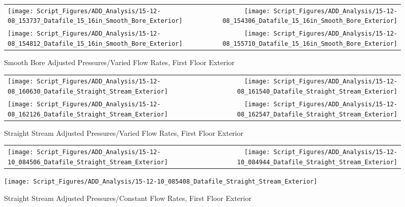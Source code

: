 \documentclass{article}
\begin{document}
\clearpage

\begin{figure}[ht]
\begin{tabular*}{\textwidth}{lr}
\texttt{[image: Script\_Figures/ADD\_Analysis/15-12-08\_153737\_Datafile\_15\_16in\_Smooth\_Bore\_Exterior]} &
\texttt{[image: Script\_Figures/ADD\_Analysis/15-12-08\_154306\_Datafile\_15\_16in\_Smooth\_Bore\_Exterior]} \\
\texttt{[image: Script\_Figures/ADD\_Analysis/15-12-08\_154812\_Datafile\_15\_16in\_Smooth\_Bore\_Exterior]} &
\texttt{[image: Script\_Figures/ADD\_Analysis/15-12-08\_155710\_Datafile\_15\_16in\_Smooth\_Bore\_Exterior]} \\
\end{tabular*}
\caption{Smooth Bore Adjusted Pressures/Varied Flow Rates, First Floor Exterior}
\label{fig:Smooth Bore Adjusted Pressures/Varied Flow Rates, First Floor Exterior}
\end{figure}

\clearpage

\begin{figure}[ht]
\begin{tabular*}{\textwidth}{lr}
\texttt{[image: Script\_Figures/ADD\_Analysis/15-12-08\_160630\_Datafile\_Straight\_Stream\_Exterior]} &
\texttt{[image: Script\_Figures/ADD\_Analysis/15-12-08\_161540\_Datafile\_Straight\_Stream\_Exterior]} \\
\texttt{[image: Script\_Figures/ADD\_Analysis/15-12-08\_162126\_Datafile\_Straight\_Stream\_Exterior]} &
\texttt{[image: Script\_Figures/ADD\_Analysis/15-12-08\_162547\_Datafile\_Straight\_Stream\_Exterior]} \\
\end{tabular*}
\caption{Straight Stream Adjusted Pressures/Varied Flow Rates, First Floor Exterior}
\label{fig:Straight Stream Adjusted Pressures/Varied Flow Rates, First Floor Exterior}
\end{figure}

\clearpage

\begin{figure}[ht]
\begin{tabular*}{\textwidth}{lr}
\texttt{[image: Script\_Figures/ADD\_Analysis/15-12-10\_084506\_Datafile\_Straight\_Stream\_Exterior]} &
\texttt{[image: Script\_Figures/ADD\_Analysis/15-12-10\_084944\_Datafile\_Straight\_Stream\_Exterior]} \\
\end{tabular*}
\centering
\texttt{[image: Script\_Figures/ADD\_Analysis/15-12-10\_085408\_Datafile\_Straight\_Stream\_Exterior]}
\caption{Straight Stream Adjusted Pressures/Constant Flow Rates, First Floor Exterior}
\label{fig:Straight Stream Adjusted Pressures/Constant Flow Rates, First Floor Exterior}
\end{figure}
\end{document}
